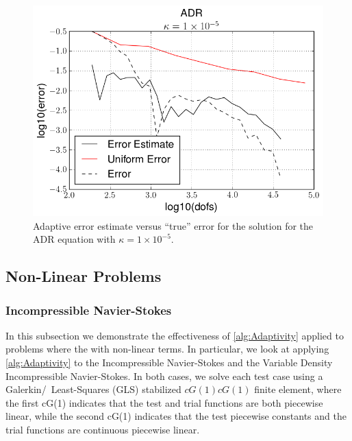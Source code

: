 \begin{test}[Convection Dominated ADR, $\kappa = 1\times10^{-5}$]
    \begin{figure}[h]
        \centering
        \includegraphics[scale=0.5]{Figures/AdaptiveADRkappa1E-5.png}
        \caption{Adaptive error estimate versus ``true'' error for the solution
            for the ADR equation with $\kappa=1\times 10^{-5}$.}
        \label{fig:ADRk1E-5_err}
    \end{figure}

\end{test}

\subsection{Non-Linear Problems}

\subsubsection{Incompressible Navier-Stokes}

In this subsection we demonstrate the effectiveness of \autoref{alg:Adaptivity}
applied to problems where the with non-linear terms. In particular, we look at
applying \autoref{alg:Adaptivity} to the Incompressible Navier-Stokes and the
Variable Density Incompressible Navier-Stokes. In both cases, we solve each test
case using a Galerkin\slash~Least-Squares (GLS) stabilized $cG(1)cG(1)$ finite
element, where the first cG(1) indicates that the test and trial functions are
both piecewise linear, while the second cG(1) indicates that the test piecewise
constants and the trial functions are continuous piecewise linear.

